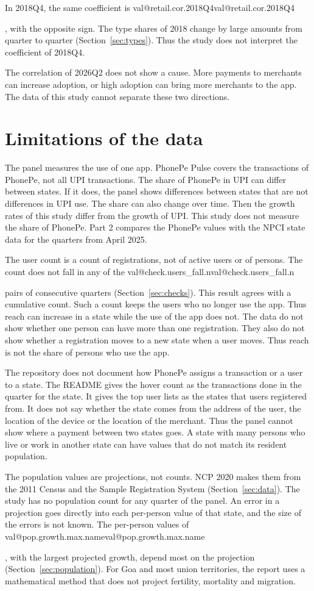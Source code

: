 \documentclass[11pt,a4paper]{article}
\makeatletter
\newcommand{\val}[1]{\ifcsname val@#1\endcsname\csname val@#1\endcsname\else
  \PackageError{study}{Unknown value key `#1'}{Run Rscript src/R/part1_study.R}\fi}
\makeatother
\begin{document}
In 2018Q4, the same coefficient is \val{retail.cor.2018Q4}, with the opposite sign. The type shares of 2018 change by large amounts from quarter to quarter (Section~\ref{sec:types}). Thus the study does not interpret the coefficient of 2018Q4.

The correlation of 2026Q2 does not show a cause. More payments to merchants can increase adoption, or high adoption can bring more merchants to the app. The data of this study cannot separate these two directions.

\section{Limitations of the data}\label{sec:limits}
The panel measures the use of one app. PhonePe Pulse covers the transactions of PhonePe, not all UPI transactions. The share of PhonePe in UPI can differ between states. If it does, the panel shows differences between states that are not differences in UPI use. The share can also change over time. Then the growth rates of this study differ from the growth of UPI. This study does not measure the share of PhonePe. Part 2 compares the PhonePe values with the NPCI state data for the quarters from April 2025.

The user count is a count of registrations, not of active users or of persons. The count does not fall in any of the \val{check.users_fall.n} pairs of consecutive quarters (Section~\ref{sec:checks}). This result agrees with a cumulative count. Such a count keeps the users who no longer use the app. Thus reach can increase in a state while the use of the app does not. The data do not show whether one person can have more than one registration. They also do not show whether a registration moves to a new state when a user moves. Thus reach is not the share of persons who use the app.

The repository does not document how PhonePe assigns a transaction or a user to a state. The README gives the hover count as the transactions done in the quarter for the state. It gives the top user lists as the states that users registered from. It does not say whether the state comes from the address of the user, the location of the device or the location of the merchant. Thus the panel cannot show where a payment between two states goes. A state with many persons who live or work in another state can have values that do not match its resident population.

The population values are projections, not counts. NCP 2020 makes them from the 2011 Census and the Sample Registration System (Section~\ref{sec:data}). The study has no population count for any quarter of the panel. An error in a projection goes directly into each per-person value of that state, and the size of the errors is not known. The per-person values of \val{pop.growth.max.name}, with the largest projected growth, depend most on the projection (Section~\ref{sec:population}). For Goa and most union territories, the report uses a mathematical method that does not project fertility, mortality and migration.
\end{document}
